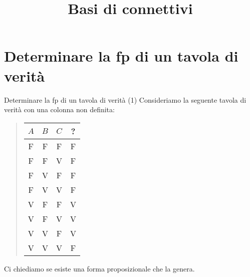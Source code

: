 \documentclass[aspectratio=169,10pt,dvipsnames,xcolor=table,handout]{beamer}
\title{Basi di connettivi}
\begin{document}
\begin{frame}
    \titlepage
\end{frame}

\section[fp da tavola di verità]{Determinare la fp di un tavola di verità}

\begin{frame}{Determinare la fp di un tavola di verità (1)}
    Consideriamo la seguente tavola di verità con una colonna non definita:

    \medskip
    \begin{quote}
        \begin{tabular}{c|c|c||c}
            $A$ & $B$ & $C$ & ? \\
            \hline
            F   & F   & F   & F \\
            F   & F   & V   & F \\
            F   & V   & F   & F \\
            F   & V   & V   & F \\
            V   & F   & F   & V \\
            V   & F   & V   & V \\
            V   & V   & F   & V \\
            V   & V   & V   & F
        \end{tabular}
    \end{quote}

    \medskip
    Ci chiediamo se esiste una forma proposizionale che la genera.
\end{frame}
\end{document}
